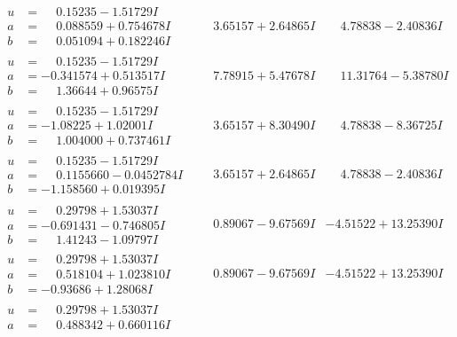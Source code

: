 \documentclass[1p]{elsarticle_modified}
\theoremstyle{definition}
\begin{document}
$$\begin{array}{c|c|c}
\begin{aligned}
u &= \phantom{-}0.15235 - 1.51729 I \\
a &= \phantom{-}0.088559 + 0.754678 I \\
b &= \phantom{-}0.051094 + 0.182246 I\end{aligned}
 & \phantom{-}3.65157 + 2.64865 I & \phantom{-}4.78838 - 2.40836 I \\ \hline\begin{aligned}
u &= \phantom{-}0.15235 - 1.51729 I \\
a &= -0.341574 + 0.513517 I \\
b &= \phantom{-}1.36644 + 0.96575 I\end{aligned}
 & \phantom{-}7.78915 + 5.47678 I & \phantom{-}11.31764 - 5.38780 I \\ \hline\begin{aligned}
u &= \phantom{-}0.15235 - 1.51729 I \\
a &= -1.08225 + 1.02001 I \\
b &= \phantom{-}1.004000 + 0.737461 I\end{aligned}
 & \phantom{-}3.65157 + 8.30490 I & \phantom{-}4.78838 - 8.36725 I \\ \hline\begin{aligned}
u &= \phantom{-}0.15235 - 1.51729 I \\
a &= \phantom{-}0.1155660 - 0.0452784 I \\
b &= -1.158560 + 0.019395 I\end{aligned}
 & \phantom{-}3.65157 + 2.64865 I & \phantom{-}4.78838 - 2.40836 I \\ \hline\begin{aligned}
u &= \phantom{-}0.29798 + 1.53037 I \\
a &= -0.691431 - 0.746805 I \\
b &= \phantom{-}1.41243 - 1.09797 I\end{aligned}
 & \phantom{-}0.89067 - 9.67569 I & -4.51522 + 13.25390 I \\ \hline\begin{aligned}
u &= \phantom{-}0.29798 + 1.53037 I \\
a &= \phantom{-}0.518104 + 1.023810 I \\
b &= -0.93686 + 1.28068 I\end{aligned}
 & \phantom{-}0.89067 - 9.67569 I & -4.51522 + 13.25390 I \\ \hline\begin{aligned}
u &= \phantom{-}0.29798 + 1.53037 I \\
a &= \phantom{-}0.488342 + 0.660116 I \\

\end{aligned}
\end{array}$$
\end{document}
